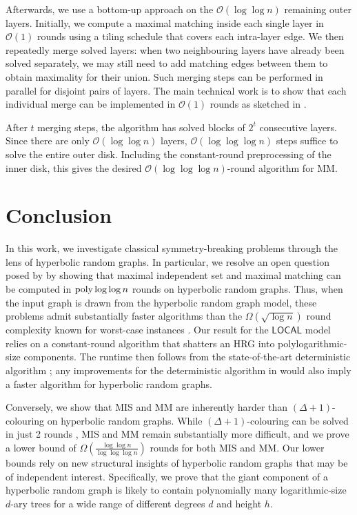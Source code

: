 \documentclass[letterpaper,11pt]{article}
\newcommand{\poly}{\operatorname{\text{{\rm poly}}}}
\newcommand{\1}{\mathbb I}
\newcommand{\bigO}{\mathcal{O}}
\newcommand{\LOCAL}{\ensuremath{\mathsf{LOCAL}}\xspace}
\begin{document}
Afterwards, we use a bottom-up approach on the $\bigO(\log\log n)$ remaining outer layers. Initially, we compute a maximal matching inside each single layer in $\bigO(1)$ rounds using a tiling schedule that covers each intra-layer edge. We then repeatedly merge solved layers: when two neighbouring layers have already been solved separately, we may still need to add matching edges between them to obtain maximality for their union. Such merging steps can be performed in parallel for disjoint pairs of layers. The main technical work is to show that each individual merge can be implemented in $\bigO(1)$ rounds as sketched in .

After $t$ merging steps, the algorithm has solved blocks of $2^t$ consecutive layers. Since there are only $\bigO(\log\log n)$ layers, $\bigO(\log\log\log n)$ steps suffice to solve the entire outer disk. Including the constant-round preprocessing of the inner disk, this gives the desired $\bigO(\log\log\log n)$-round algorithm for MM.

\section{Conclusion}
In this work, we investigate classical symmetry-breaking problems through the lens of hyperbolic random graphs. In particular, we resolve an open question posed by \cite{mr-soda-26} by showing that maximal independent set and maximal matching can be computed in $\poly\log\log n$ rounds on hyperbolic random graphs. Thus, when the input graph is drawn from the hyperbolic random graph model, these problems admit substantially faster algorithms than the $\Omega(\sqrt{\log n})$ round complexity known for worst-case instances \cite{khoury2025round}. Our result for the \LOCAL model relies on a constant-round algorithm that shatters an HRG into polylogarithmic-size components. The runtime then follows from the state-of-the-art deterministic algorithm \cite{GG24}; any improvements for the deterministic algorithm in \cite{GG24} would also imply a faster algorithm for hyperbolic random graphs. 

Conversely, we show that MIS and MM are inherently harder than $(\Delta+1)$-colouring on hyperbolic random graphs. While $(\Delta+1)$-colouring can be solved in just 2 rounds \cite{mr-soda-26}, MIS and MM remain substantially more difficult, and we prove a lower bound of $\Omega\left(\frac{\log\log n}{\log\log\log n}\right)$ rounds for both MIS and MM. Our lower bounds rely on new structural insights of hyperbolic random graphs that may be of independent interest. Specifically, we prove that the giant component of a hyperbolic random graph is likely to contain polynomially many logarithmic-size $d$-ary trees for a wide range of different degrees $d$ and height $h$.
\end{document}
